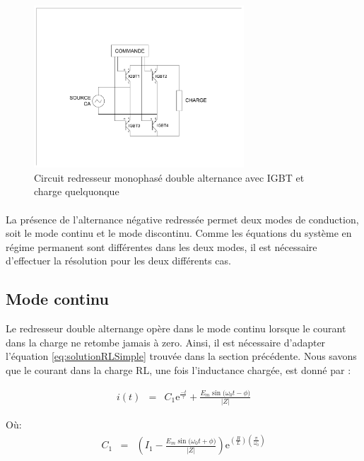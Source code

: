 \begin{figure}[htb!]
  \begin{center}  
    \includegraphics[width=0.7\textwidth]{Circuit/RedresseurMonophaseDoubleAlternanceIGBT}
    \caption{Circuit redresseur monophasé double alternance avec IGBT et charge quelquonque}
    \label{fig:RedresseurMonophaseDoubleAlternanceIGBT}
  \end{center}   
\end{figure}

\paragraph{}
La présence de l'alternance négative redressée permet deux modes de conduction, soit le mode continu et le mode discontinu. Comme les équations du système en régime permanent sont différentes dans les deux modes, il est nécessaire d'effectuer la résolution pour les deux différents cas.

\subsection{Mode continu}
Le redresseur double alternange opère dans le mode continu lorsque le courant dans la charge ne retombe jamais à zero. Ainsi, il est nécessaire d'adapter l'équation \ref{eq:solutionRLSimple} trouvée dans la section précédente. Nous savons que le courant dans la charge RL, une fois l'inductance chargée, est donné par :

\begin{eqnarray}
\label{eq:RedresseurMonophaseDoubleAlternanceContinu1}
i(t) &=& C_1\mbox{e}^{\frac{-t}{\tau}} + \frac{E_m\sin{(\omega_0 t - \phi})}{|Z|}
\end{eqnarray}

Où:
\begin{eqnarray}
C_1 &=& \left( I_1 - \frac{E_m\sin{(\omega_0 t + \phi})}{|Z|}\right)\mbox{e}^{\left(\frac{R}{L}\right)\left(\frac{\pi}{\omega_0}\right)}
\end{eqnarray}

